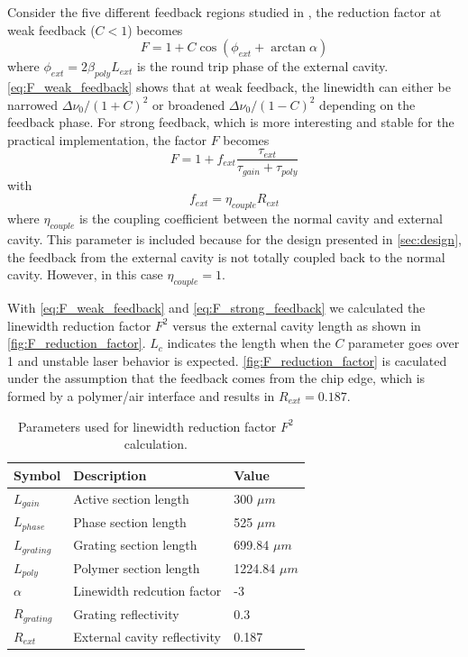 Consider the five different feedback regions studied in \cite{tkach1986regimes}, the reduction factor at weak feedback ($C<1$) becomes \cite{coldren2012diode, petermann2012laser}
\begin{equation}
    F=1+C\cos(\phi_{ext}+\arctan\alpha)
    \label{eq:F_weak_feedback}
\end{equation}
where $\phi_{ext}=2\beta_{poly}L_{ext}$ is the round trip phase of the external cavity. \autoref{eq:F_weak_feedback} shows that at weak feedback, the linewidth can either be narrowed $\Delta\nu_0/(1+C)^2$ or broadened $\Delta\nu_0/(1-C)^2$ depending on the feedback phase. For strong feedback, which is more interesting and stable for the practical implementation, the factor $F$ becomes
\begin{equation}
    F=1+f_{ext}\frac{\tau_{ext}}{\tau_{gain}+\tau_{poly}}
    \label{eq:F_strong_feedback}
\end{equation}
with
\begin{equation}
    f_{ext}=\eta_{couple}R_{ext}
    \label{eq:F_f_ext}
\end{equation}
where $\eta_{couple}$ is the coupling coefficient between the normal cavity and external cavity. This parameter is included because for the design presented in \autoref{sec:design}, the feedback from the external cavity is not totally coupled back to the normal cavity. However, in this case $\eta_{couple}=1$.

With \autoref{eq:F_weak_feedback} and \autoref{eq:F_strong_feedback} we calculated the linewidth reduction factor $F^2$ versus the external cavity length as shown in \autoref{fig:F_reduction_factor}. $L_c$ indicates the length when the $C$ parameter goes over 1 and unstable laser behavior is expected. \autoref{fig:F_reduction_factor} is caculated under the assumption that the feedback comes from the chip edge, which is formed by a polymer/air interface and results in $R_{ext}=0.187$.

\begin{table}[ht]
    \centering
    \caption{Parameters used for linewidth reduction factor $F^2$ calculation.}
    \begin{tabular}{@{}lll@{}}
    \toprule
    Symbol        & Description                  & Value           \\ \midrule
    $L_{gain}$    & Active section length        & 300 $\mu m$     \\
    $L_{phase}$   & Phase section length         & 525 $\mu m$     \\
    $L_{grating}$ & Grating section length       & 699.84 $\mu m$  \\
    $L_{poly}$    & Polymer section length       & 1224.84 $\mu m$ \\
    $\alpha$      & Linewidth redcution factor   & -3              \\
    $R_{grating}$ & Grating reflectivity         & 0.3             \\
    $R_{ext}$     & External cavity reflectivity & 0.187           \\ \bottomrule
    \end{tabular}
    \label{tab:F_reduction_factor}
\end{table}

